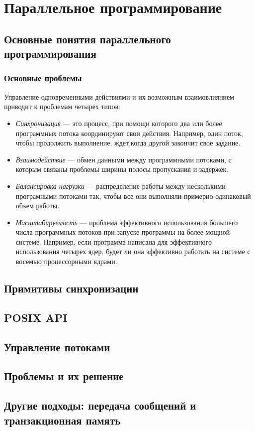 \chapter{Параллельное программирование}
\label{ch:concurrent}



\section{Основные понятия параллельного программирования}

\subsection{Основные проблемы}

Управление одновременными действиями и их возможным взаимовлиянием приводит к проблемам четырех типов:
\begin{itemize}
\item \emph{Синхронизация} --- это процесс, при помощи которого два или более программных потока координируют свои действия. Например, один поток, чтобы продолжить выполнение, ждет,когда другой закончит свое задание.
\item \emph{Взаимодействие} --- обмен данными между программными потоками, с которым связаны проблемы ширины полосы пропускания и задержек.
\item \emph{Балансировка нагрузки} --- распределение работы между несколькими програмными потоками так, чтобы все они выполняли примерно одинаковый объем работы.
\item \emph{Масштабируемость} --- проблема эффективного использования большего числа программных потоков при запуске программы на более мощной системе. Например, если программа написана для эффективного использования четырех ядер, будет ли она эффективно работать на системе с восемью процессорными ядрами.
\end{itemize}



\section{Примитивы синхронизации}



\section{POSIX API}



\section{Управление потоками}



\section{Проблемы и их решение}



\section{Другие подходы: передача сообщений и транзакционная память}
